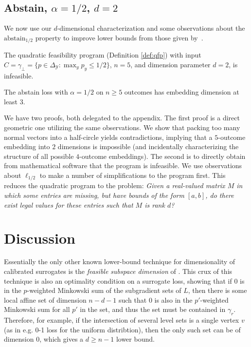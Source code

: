 \documentclass[anon]{colt2020} %
\newcommand{\abstain}[1]{\mathrm{abstain}_{#1}}
\newcommand{\simplex}{\Delta_\Y}
\newcommand{\Y}{\mathcal{Y}}
\begin{document}
\subsection{Abstain, $\alpha = 1/2$, $d=2$}
We now use our $d$-dimensional characterization and some observations about the $\abstain{1/2}$ property to improve lower bounds from those given by~\cite{ramaswamy2016convex}.

\begin{proposition}\label{prop:qfp-fails-abstain}
  The quadratic feasibility program (Definition \ref{def:qfp}) with input $C = \gamma_{\bot} = \{p \in \simplex: \max_y p_y \leq 1/2\}$, $n=5$, and dimension parameter $d=2$, is infeasible.
\end{proposition}
\begin{corollary}
  The abstain loss with $\alpha=1/2$ on $n\geq 5$ outcomes has embedding dimension at least $3$.
\end{corollary}

We have two proofs, both delegated to the appendix.
The first proof is a direct geometric one utilizing the same observations.
We show that packing too many normal vectors into a half-circle yields contradictions, implying that a $5$-outcome embedding into $2$ dimensions is impossible (and incidentally characterizing the structure of all possible $4$-outcome embeddings).
The second is to directly obtain from mathematical software that the program is infeasible.
We use observations about $\ell_{1/2}$ to make a number of simplifications to the program first.
This reduces the quadratic program to the problem: 
\emph{Given a real-valued matrix $M$ in which some entries are missing, but have bounds of the form $[a,b]$, do there exist legal values for these entries such that $M$ is rank $d$?}


\section{Discussion} \label{sec:conclusion}

Essentially the only other known lower-bound technique for dimensionality of calibrated surrogates is the \emph{feasible subspace dimension} of \cite{ramaswamy2016convex}.
This crux of this technique is also an optimality condition on a surrogate loss, showing that if $0$ is in the $p$-weighted Minkowski sum of the subgradient sets of $L$, then there is some local affine set of dimension $n-d-1$ such that $0$ is also in the $p'$-weighted Minkowski sum for all $p'$ in the set, and thus the set must be contained in $\gamma_r$.
Therefore, for example, if the intersection of several level sets is a single vertex $v$ (as in e.g. 0-1 loss for the uniform distribtion), then the only such set can be of dimension $0$, which gives a $d \geq n-1$ lower bound.
\end{document}
